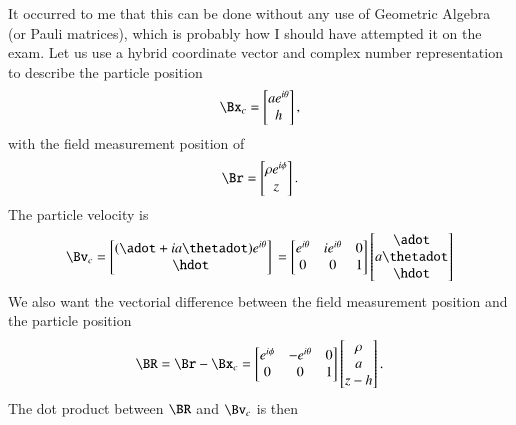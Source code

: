 {It occurred to me that this can be done without any use of Geometric Algebra (or Pauli matrices), which is probably how I should have attempted it on the exam.  Let us use a hybrid coordinate vector and complex number representation to describe the particle position
%
\begin{equation}\label{eqn:relativisticElectrodynamicsExamReflection:800}
\Bx_c =
\begin{bmatrix}
a e^{i\theta} \\
h
\end{bmatrix},
\end{equation}
with the field measurement position of
\begin{equation}\label{eqn:relativisticElectrodynamicsExamReflection:820}
\Br =
\begin{bmatrix}
\rho e^{i\phi} \\
z
\end{bmatrix}.
\end{equation}
%
The particle velocity is
%
\begin{equation}\label{eqn:relativisticElectrodynamicsExamReflection:840}
\Bv_c
=
\begin{bmatrix}
(\adot + i a \thetadot) e^{i\theta} \\
\hdot
\end{bmatrix} \\
=
\begin{bmatrix}
e^{i\theta} & i e^{i\theta} & 0 \\
0 & 0 & 1
\end{bmatrix}
\begin{bmatrix}
\adot \\
a \thetadot \\
\hdot
\end{bmatrix}
\end{equation}
%
We also want the vectorial difference between the field measurement position and the particle position
%
\begin{equation}\label{eqn:relativisticElectrodynamicsExamReflection:860}
\BR = \Br - \Bx_c =
\begin{bmatrix}
e^{i\phi} & -e^{i\theta} & 0 \\
0 & 0 & 1
\end{bmatrix}
\begin{bmatrix}
\rho \\
a \\
z - h
\end{bmatrix}.
\end{equation}
%
The dot product between \(\BR\) and \(\Bv_c\) is then
}
